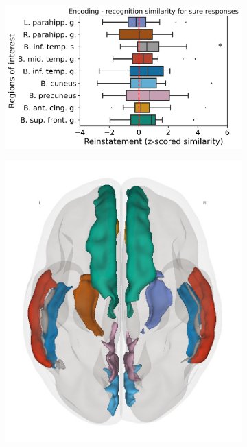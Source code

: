  \begin{figure}[!ht]
    \centering
\begin{subfigure}[]{0.6\linewidth}
    \centering
    \includegraphics[width=\linewidth]{paper/src/figures/20240710_wb-all_memory_n_enc_recog_perm_consc_consc-unconsc_incorr.png}
\end{subfigure}
\begin{subfigure}[]{0.19\linewidth}
    \centering
    \includegraphics[width=\linewidth]{paper/src/figures/wb_rois_top.jpg}

\end{subfigure}
\end{figure}
